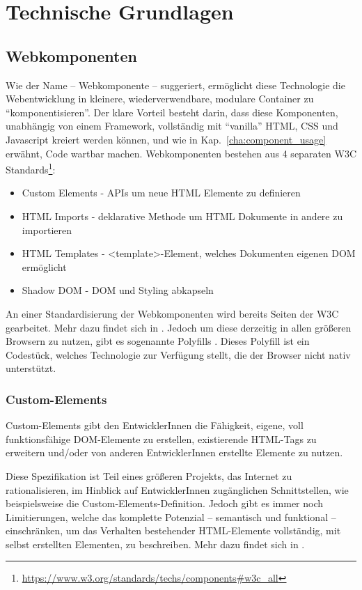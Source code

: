 \chapter{Technische Grundlagen}

\section{Webkomponenten}
\label{cha:webcomponents}
Wie der Name -- Webkomponente -- suggeriert, ermöglicht diese Technologie die Webentwicklung in kleinere, wiederverwendbare, modulare Container zu "`komponentisieren"'.  Der klare Vorteil besteht darin, dass diese Komponenten, unabhängig von einem Framework, vollständig mit "`vanilla"' HTML, CSS und Javascript kreiert werden können, und wie in Kap.~\ref{cha:component_usage} erwähnt, Code wartbar machen.
\newline
Webkomponenten bestehen aus 4 separaten W3C Standards\footnote{\url{https://www.w3.org/standards/techs/components\#w3c\_all}}:
\begin{itemize}
	\item Custom Elements - APIs um neue HTML Elemente zu definieren
	\item HTML Imports - deklarative Methode um HTML Dokumente in andere zu importieren
	\item HTML Templates - <template>-Element, welches Dokumenten eigenen DOM ermöglicht
	\item Shadow DOM - DOM und Styling abkapseln
\end{itemize}
An einer Standardisierung der Webkomponenten wird bereits Seiten der W3C gearbeitet. Mehr dazu findet sich in \cite{w3c-components}. Jedoch um diese derzeitig in allen größeren Browsern zu nutzen, gibt es sogenannte Polyfills \cite{polyfill}. Dieses Polyfill ist ein Codestück, welches Technologie zur Verfügung stellt, die der Browser nicht nativ unterstützt.

\subsection{Custom-Elements}
Custom-Elements gibt den EntwicklerInnen die Fähigkeit, eigene, voll funktionsfähige DOM-Elemente zu erstellen, existierende HTML-Tags zu erweitern und/oder von anderen EntwicklerInnen erstellte Elemente zu nutzen.  

Diese Spezifikation ist Teil eines größeren Projekts, das Internet zu rationalisieren, im Hinblick auf EntwicklerInnen zugänglichen Schnittstellen, wie beispielsweise die Custom-Elements-Definition. Jedoch gibt es immer noch Limitierungen, welche das komplette Potenzial -- semantisch und funktional -- einschränken, um das Verhalten bestehender HTML-Elemente vollständig, mit selbst erstellten Elementen, zu beschreiben. Mehr dazu findet sich in \cite{custom-elements}.

